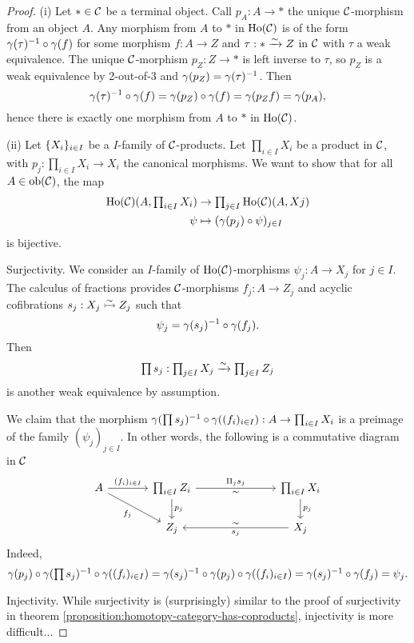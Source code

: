 \begin{proof}
(i) Let $*\in\mathcal{C}$ be a terminal object. Call $p_A:A\to*$ the unique $\mathcal{C}$-morphism from an object $A$.
Any morphism from $A$ to $*$ in $\operatorname{Ho}(\mathcal{C})$ is of the form $\gamma(\tau)^{-1}\circ\gamma(f)$ for some morphism $f:A\to Z$ and $\tau:*\xrightarrow{\sim}Z$ in $\mathcal{C}$ with $\tau$ a weak equivalence.
The unique $\mathcal{C}$-morphism $p_Z:Z\to*$ is left inverse to $\tau$, so $p_Z$ is a weak equivalence by 2-out-of-3 and $\gamma(p_Z)=\gamma(\tau)^{-1}$. Then
\[\gamma(\tau)^{-1}\circ\gamma(f)=\gamma(p_Z)\circ\gamma(f)=\gamma(p_Zf)=\gamma(p_A),\]
hence there is exactly one morphism from $A$ to $*$ in $\operatorname{Ho}(\mathcal{C})$.

(ii) Let $\{X_i\}_{i\in I}$ be a $I$-family of $\mathcal{C}$-products. Let $\prod_{i\in I}X_i$ be a product in $\mathcal{C}$, with $p_j:\prod_{i\in I}X_i\to X_i$ the canonical morphisms. We want to show that for all $A\in\operatorname{ob}(\mathcal{C})$, the map
\begin{align*}
    \operatorname{Ho}(\mathcal{C})(A,\textstyle\prod_{i\in I}X_i)&\to\textstyle\prod_{j\in I}\operatorname{Ho}(\mathcal{C})(A,Xj)\\
    \psi&\mapsto(\gamma(p_j)\circ\psi)_{j\in I}
\end{align*}
is bijective.

Surjectivity. We consider an $I$-family of $\operatorname{Ho}(\mathcal{C})$-morphisms $\psi_j:A\to X_j$ for $j\in I$. The calculus of fractions provides $\mathcal{C}$-morphisms $f_j:A\to Z_j$ and acyclic cofibrations $s_j:X_j\acco Z_j$ such that
\[\psi_j=\gamma(s_j)^{-1}\circ\gamma(f_j).\]
Then
\[\textstyle\prod s_j:\textstyle\prod_{j\in I}X_j\xrightarrow{\sim}\textstyle\prod_{j\in I}Z_j\]
is another weak equivalence by assumption.

We claim that the morphism $\gamma(\prod s_j)^{-1}\circ\gamma((f_i)_{i\in I}):A\to\prod_{i\in I}X_i$ is a preimage of the family $(\psi_j)_{j\in I}$. In other words, the following is a commutative diagram in $\mathcal{C}$
\[
\begin{tikzcd}[column sep=large]
A \arrow[r, "{(f_i)_{i \in I}}"] \arrow[dr, "f_j", swap] & \prod_{i \in I} Z_i \arrow[d, "p_j"] \arrow[rr, "\Pi_j s_j", "\sim"'] & & \prod_{i \in I} X_i \arrow[d, "p_j"]\\
 & Z_j & & X_j \arrow[ll, "s_j", "\sim"']
\end{tikzcd}
\]
Indeed,
\[\gamma(p_j)\circ\gamma(\textstyle\prod s_j)^{-1}\circ\gamma((f_i)_{i\in I})=\gamma(s_j)^{-1}\circ\gamma(p_j)\circ\gamma((f_i)_{i\in I})=\gamma(s_j)^{-1}\circ\gamma(f_j)=\psi_j.\]

Injectivity. While surjectivity is (surprisingly) similar to the proof of surjectivity in theorem \ref{proposition:homotopy-category-has-coproducts}, injectivity is more difficult...

\medskip
{}
\smallskip

\end{proof}

